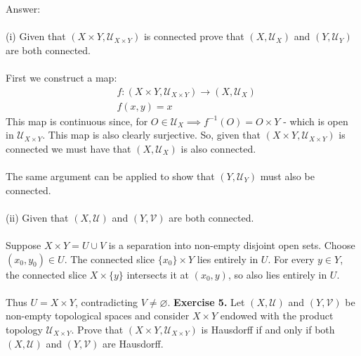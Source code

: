 \documentclass[12pt]{article}
\begin{document}
\vspace{1cm}
\noindent
Answer:\\
\\
(i) Given that $(X \times Y, \mathcal{U}_{X \times Y})$ is connected prove that $(X,\mathcal{U}_{X})$ and $(Y,\mathcal{U}_{Y})$ are both connected.\\
\\
First we construct a map:
\begin{align*}
&f: (X \times Y, \mathcal{U}_{X \times Y}) \to (X,\mathcal{U}_{X}) \\
&f(x,y) = x
\end{align*}
This map is continuous since, for $O \in \mathcal{U}_{X} \implies f^{-1}(O) = O \times Y$ - which is open in $\mathcal{U}_{X \times Y}$. This map is also clearly surjective.  So, given that $(X \times Y, \mathcal{U}_{X \times Y})$ is connected we must have that $(X,\mathcal{U}_{X})$ is also connected.\\
\\
The same argument can be applied to show that $(Y,\mathcal{U}_{Y})$ must also be connected.\\ 
\\
(ii) Given that $(X,\mathcal{U})$ and $(Y,\mathcal{V})$ are both connected.\\
\\
Suppose $X \times Y = U \cup V$ is a separation into non-empty disjoint open sets. Choose $(x_0,y_0) \in U$.
The connected slice $\{x_0\} \times Y$ lies entirely in $U$. For every $y \in Y$, the connected slice $X \times \{y\}$ intersects it at $(x_0,y)$, so also lies entirely in $U$.\\
\\
Thus $U = X \times Y$, contradicting $V \neq \varnothing$.
\newpage
\noindent\textbf{Exercise 5.} Let $(X,\mathcal{U})$ and $(Y,\mathcal{V})$ be non-empty topological spaces and consider $X\times Y$ endowed with the product topology $\mathcal{U}_{X\times Y}$. Prove that $(X\times Y,\mathcal{U}_{X\times Y})$ is Hausdorff if and only if both $(X,\mathcal{U})$ and $(Y,\mathcal{V})$ are Hausdorff.
\end{document}
